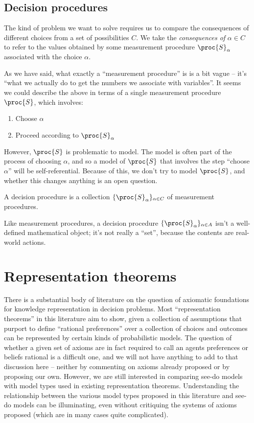 \subsection{Decision procedures}\label{sec:actions}

The kind of problem we want to solve requires us to compare the consequences of different choices from a set of possibilities $C$. We take the \emph{consequences of} $\alpha\in C$ to refer to the values obtained by some measurement procedure $\proc{S}_\alpha$ associated with the choice $\alpha$.

As we have said, what exactly a ``measurement procedure'' is is a bit vague -- it's ``what we actually do to get the numbers we associate with variables''. It seems we could describe the above in terms of a single measurement procedure $\proc{S}$, which involves:

\begin{enumerate}
    \item Choose $\alpha$
    \item Proceed according to $\proc{S}_\alpha$
\end{enumerate}

However, $\proc{S}$ is problematic to model. The model is often part of the process of choosing $\alpha$, and so a model of $\proc{S}$ that involves the step ``choose $\alpha$'' will be self-referential. Because of this, we don't try to model $\proc{S}$, and whether this changes anything is an open question.

\begin{definition}
A decision procedure is a collection $\{\proc{S}_\alpha\}_{\alpha\in C}$ of measurement procedures.
\end{definition}

Like measurement procedures, a decision procedure $\{\proc{S}_\alpha\}_{\alpha\in A}$ isn't a well-defined mathematical object; it's not really a ``set'', because the contents are real-world actions.

\section{Representation theorems}\label{sec:how_represent_conseqeunces}

There is a substantial body of literature on the question of axiomatic foundations for knowledge representation in decision problems. Most ``representation theorems'' in this literature aim to show, given a collection of assumptions that purport to define ``rational preferences'' over a collection of choices and outcomes can be represented by certain kinds of probabilistic models. The question of whether a given set of axioms are in fact required to call an agents preferences or beliefs rational is a difficult one, and we will not have anything to add to that discussion here -- neither by commenting on axioms already proposed or by proposing our own. However, we are still interested in comparing see-do models with model types used in existing representation theorems. Understanding the relationship between the various model types proposed in this literature and see-do models can be illuminating, even without critiquing the systems of axioms proposed (which are in many cases quite complicated).

